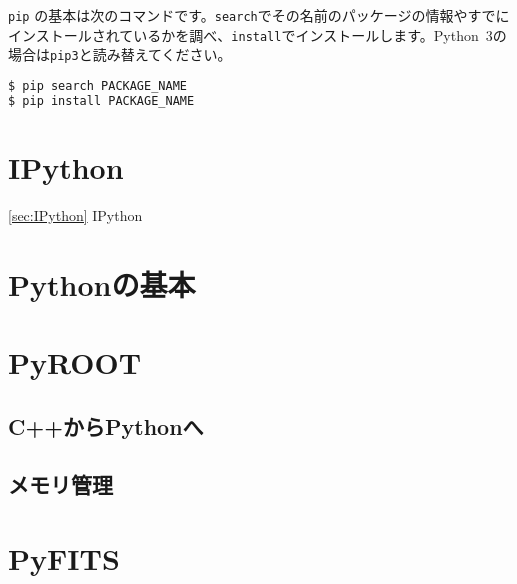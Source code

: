\texttt{pip} の基本は次のコマンドです。\texttt{search}でその名前のパッケージの情報やすでにインストールされているかを調べ、\texttt{install}でインストールします。Python~3の場合は\texttt{pip3}と読み替えてください。
\begin{lstlisting}[language=bash]
$ pip search PACKAGE_NAME
$ pip install PACKAGE_NAME
\end{lstlisting}  

\section{IPython}
\ref{sec:IPython}
IPython

\section{Pythonの基本}

\section{PyROOT}

\subsection{C++からPythonへ}

\subsection{メモリ管理}

\section{PyFITS}

